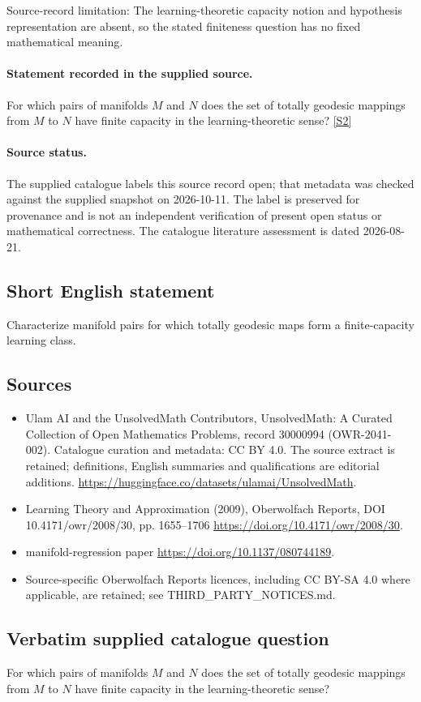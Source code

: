 \documentclass[11pt]{article}
\begin{document}
Source-record limitation: The learning-theoretic capacity notion and hypothesis representation are absent, so the stated finiteness question has no fixed mathematical meaning.
\paragraph{Statement recorded in the supplied source.}
For which pairs of manifolds $M$ and $N$ does the set of totally geodesic mappings from $M$ to $N$ have finite capacity in the learning-theoretic sense? \href{https://doi.org/10.4171/owr/2008/30}{[S2]}
\paragraph{Source status.}
The supplied catalogue labels this source record open; that metadata was checked against the supplied snapshot on 2026-10-11. The label is preserved for provenance and is not an independent verification of present open status or mathematical correctness. The catalogue literature assessment is dated 2026-08-21.
\subsection{Short English statement}
Characterize manifold pairs for which totally geodesic maps form a finite-capacity learning class.
\subsection{Sources}
\begin{itemize}
\item[S1] Ulam AI and the UnsolvedMath Contributors, UnsolvedMath: A Curated Collection of Open Mathematics Problems, record 30000994 (OWR-2041-002). Catalogue curation and metadata: CC BY 4.0. The source extract is retained; definitions, English summaries and qualifications are editorial additions.
\url{https://huggingface.co/datasets/ulamai/UnsolvedMath}.
\item[S2] Learning Theory and Approximation (2009), Oberwolfach Reports, DOI 10.4171/owr/2008/30, pp. 1655--1706
\url{https://doi.org/10.4171/owr/2008/30}.
\item[S3] manifold-regression paper
\url{https://doi.org/10.1137/080744189}.
\item Source-specific Oberwolfach Reports licences, including CC BY-SA 4.0 where applicable, are retained; see THIRD\_PARTY\_NOTICES.md.
\end{itemize}
\subsection{Verbatim supplied catalogue question}
For which pairs of manifolds $M$ and $N$ does the set of totally geodesic mappings from $M$ to $N$ have finite capacity in the learning-theoretic sense?
\end{document}
